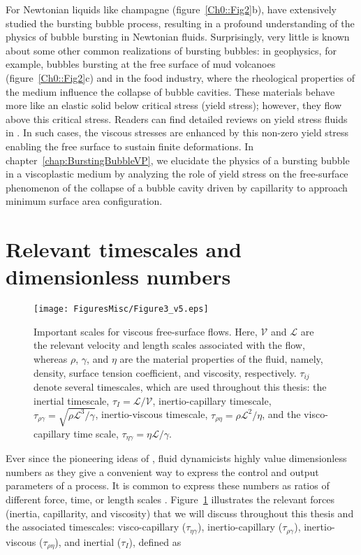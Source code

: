 For Newtonian liquids like champagne (figure~\ref{Ch0::Fig2}b), \citet{duchemin2002jet, ganan2017revision, deike2018dynamics, gordillo2019capillary} have extensively studied the bursting bubble process, resulting in a profound understanding of the physics of bubble bursting in Newtonian fluids. Surprisingly, very little is known about some other common realizations of bursting bubbles: in geophysics, for example, bubbles bursting at the free surface of mud volcanoes (figure~\ref{Ch0::Fig2}c) and in the food industry, where the rheological properties of the medium influence the collapse of bubble cavities. These materials behave more like an elastic solid below critical stress (yield stress); however, they flow above this critical stress. Readers can find detailed reviews on yield stress fluids in \citet{bird1983rheology,coussot2014yield,balmforth2014yielding,bonn2017yield}. In such cases, the viscous stresses are enhanced by this non-zero yield stress enabling the free surface to sustain finite deformations. In chapter~\ref{chap:BurstingBubbleVP}, we elucidate the physics of a bursting bubble in a viscoplastic medium by analyzing the role of yield stress on the free-surface phenomenon of the collapse of a bubble cavity driven by capillarity to approach minimum surface area configuration. 

\section*{Relevant timescales and dimensionless numbers}
\begin{figure}
	\centering
	\texttt{[image: FiguresMisc/Figure3\_v5.eps]}
	\caption{Important scales for viscous free-surface flows. Here, $\mathcal{V}$ and $\mathcal{L}$ are the relevant velocity and length scales associated with the flow, whereas $\rho$, $\gamma$, and $\eta$ are the material properties of the fluid, namely, density, surface tension coefficient, and viscosity, respectively. $\tau_{ij}$ denote several timescales, which are used throughout this thesis: the inertial timescale, $\tau_I = \mathcal{L}/\mathcal{V}$, inertio-capillary timescale, $\tau_{\rho\gamma} = \sqrt{\rho\mathcal{L}^3/\gamma}$, inertio-viscous timescale, $\tau_{\rho\eta} = \rho\mathcal{L}^2/\eta$, and the visco-capillary time scale, $\tau_{\eta\gamma} = \eta\mathcal{L}/\gamma$.}
	\label{Ch0::Fig3}
\end{figure}

Ever since the pioneering ideas of \citet{buckingham1914physically, buckingham1915principle}, fluid dynamicists highly value dimensionless numbers as they give a convenient way to express the control and output parameters of a process. It is common to express these numbers as ratios of different force, time, or length scales \citep{lohse2022fundamental}. Figure~\ref{Ch0::Fig3} illustrates the relevant forces (inertia, capillarity, and viscosity) that we will discuss throughout this thesis and the associated timescales: visco-capillary ($\tau_{\eta\gamma}$), inertio-capillary ($\tau_{\rho\gamma}$), inertio-viscous  ($\tau_{\rho\eta} $), and inertial ($\tau_I$), defined as


